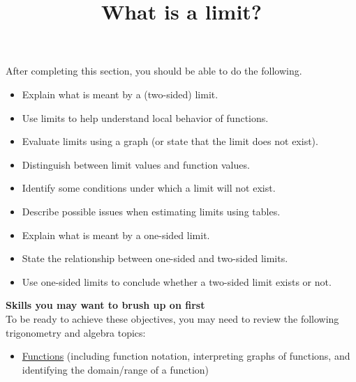\documentclass{ximera}
\title{What is a limit?}
\begin{document}
\begin{abstract}
\end{abstract}

\maketitle

\begin{sectionOutcomes}
After completing this section, you should be able to do the following.

\begin{itemize}
	\item Explain what is meant by a (two-sided) limit.
    \item Use limits to help understand local behavior of functions.
	\item Evaluate limits using a graph (or state that the limit does not exist).
    	\item Distinguish between limit values and function values.
	\item Identify some conditions under which a limit will not exist.
	\item Describe possible issues when estimating limits using tables.
	\item Explain what is meant by a one-sided limit.
	\item State the relationship between one-sided and two-sided limits.
    \item Use one-sided limits to conclude whether a two-sided limit exists or not. 
\end{itemize}
\end{sectionOutcomes}

\phantom{text}%


\textbf{Skills you may want to brush up on first} \\ To be ready to achieve these objectives, you may need to review the following trigonometry and algebra topics: 
\begin{itemize}
    \item \href{https://ximera.osu.edu/math160fa17/m160prerequisites/understandingFunctions/titlePage}{Functions} (including function notation, interpreting graphs of functions, and identifying the domain/range of a function)
\end{itemize}
\end{document}
